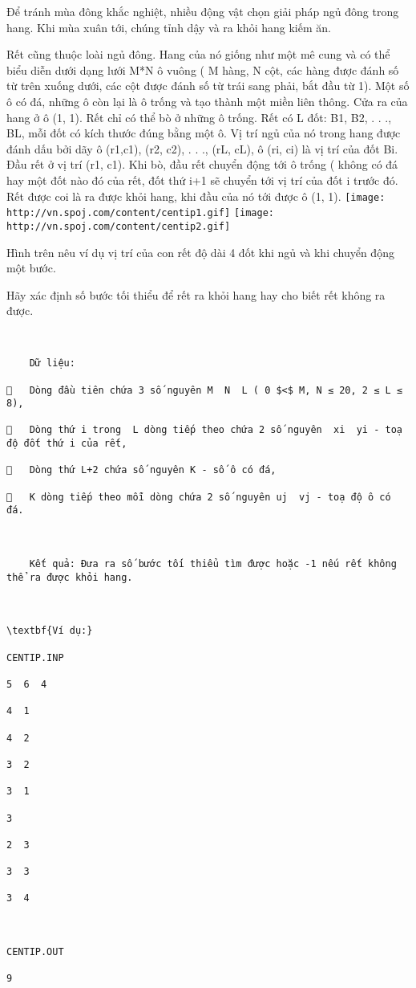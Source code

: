 

Để tránh mùa đông khắc nghiệt, nhiều động vật chọn giải pháp ngủ đông trong hang. Khi mùa xuân tới, chúng tỉnh dậy và ra khỏi hang kiếm ăn.

Rết cũng thuộc loài ngủ đông. Hang của nó giống như một mê cung và có thể biểu diễn dưới dạng lưới M*N ô vuông ( M hàng, N cột, các hàng được đánh số từ trên xuống dưới, các cột được đánh số từ trái sang phải, bắt đầu từ 1). Một số ô có đá, những ô còn lại là ô trống và tạo thành một miền liên thông. Cửa ra của hang ở ô (1, 1). Rết chỉ có thể bò ở những ô trống. Rết có L đốt: B1, B2, . . ., BL, mỗi đốt có kích thước đúng bằng một ô. Vị trí ngủ của nó trong hang được đánh dấu bởi dãy ô (r1,c1), (r2, c2), . . ., (rL, cL), ô (ri, ci) là vị trí của đốt Bi. Đầu rết ở vị trí (r1, c1). Khi bò, đầu rết chuyển động tới ô trống ( không có đá hay một đốt nào đó của rết, đốt thứ i+1 sẽ chuyển tới vị trí của đốt i trước đó. Rết được coi là ra được khỏi hang, khi đầu của nó tới được ô (1, 1).
\texttt{[image: http://vn.spoj.com/content/centip1.gif]}
\texttt{[image: http://vn.spoj.com/content/centip2.gif]}

Hình trên  nêu ví dụ vị trí của con rết độ dài 4 đốt khi ngủ và khi chuyển động một bước.

Hãy xác định số bước tối thiểu để rết ra khỏi hang hay cho biết rết không ra được.
\begin{verbatim}


	Dữ liệu: 

	Dòng đầu tiên chứa 3 số nguyên M  N  L ( 0 $<$ M, N ≤ 20, 2 ≤ L ≤ 8),

	Dòng thứ i trong  L dòng tiếp theo chứa 2 số nguyên  xi  yi - toạ độ đốt thứ i của rết,

	Dòng thứ L+2 chứa số nguyên K - số ô có đá,

	K dòng tiếp theo mỗi dòng chứa 2 số nguyên uj  vj - toạ độ ô có đá.



	Kết quả: Đưa ra số bước tối thiểu tìm được hoặc -1 nếu rết không thể ra được khỏi hang.



\textbf{Ví dụ:}

CENTIP.INP		

5  6  4		

4  1

4  2

3  2

3  1

3

2  3

3  3

3  4		



CENTIP.OUT

9



\end{verbatim}